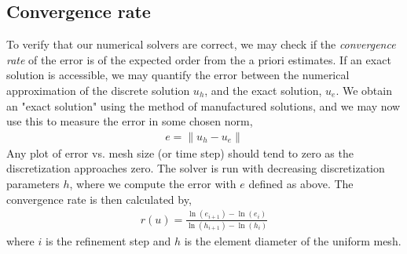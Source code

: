\subsection{Convergence rate} \label{section:convergence_rate}
To verify that our numerical solvers are correct, we may check if the \textit{convergence rate} of the error is of the expected order from the a priori estimates. If an exact solution is accessible, we may quantify the error between the numerical approximation of the discrete solution $u_h$, and the exact solution, $u_e$. We obtain an "exact solution" using the method of manufactured solutions, and we may now use this to measure the error in some chosen norm,
\begin{align*}
e = \|u_h - u_e \|
\end{align*}
Any plot of error vs. mesh size (or time step) should tend to zero as the discretization approaches zero. The solver is run with decreasing discretization parameters $h$, where we compute the error with $e$ defined as above. The convergence rate is then calculated by,
\\
\begin{align*}
r(u) = \frac{\ln(e_{i+1}) - \ln(e_i)}{\ln(h_{i+1}) - \ln(h_i)}
\end{align*}
where $i$ is the refinement step and $h$ is the element diameter of the uniform mesh.
\newpage
